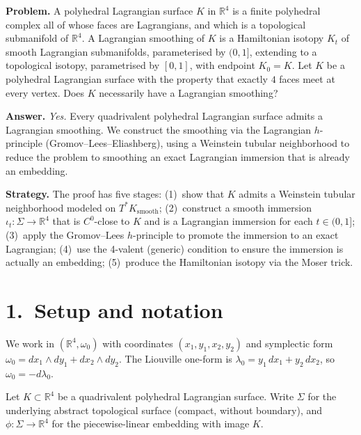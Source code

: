 

\noindent\textbf{Problem.}
A polyhedral Lagrangian surface $K$ in $\mathbb{R}^4$ is a finite polyhedral
complex all of whose faces are Lagrangians, and which is a topological
submanifold of $\mathbb{R}^4$. A Lagrangian smoothing of $K$ is a
Hamiltonian isotopy $K_t$ of smooth Lagrangian submanifolds, parameterised
by $(0,1]$, extending to a topological isotopy, parametrised by $[0,1]$,
with endpoint $K_0 = K$. Let $K$ be a polyhedral Lagrangian surface with
the property that exactly $4$ faces meet at every vertex. Does $K$
necessarily have a Lagrangian smoothing?


\bigskip
\noindent\textbf{Answer.} \textit{Yes.} Every quadrivalent polyhedral
Lagrangian surface admits a Lagrangian smoothing. We construct the smoothing
via the Lagrangian $h$-principle (Gromov--Lees--Eliashberg), using a Weinstein
tubular neighborhood to reduce the problem to smoothing an exact Lagrangian
immersion that is already an embedding.

\medskip
\noindent\textbf{Strategy.}
The proof has five stages:
(1)~show that $K$ admits a Weinstein tubular neighborhood modeled on
$T^*K_{\mathrm{smooth}}$;
(2)~construct a smooth immersion $\iota_t: \Sigma\to\mathbb{R}^4$ that is
$C^0$-close to $K$ and is a Lagrangian immersion for each $t\in(0,1]$;
(3)~apply the Gromov--Lees $h$-principle to promote the immersion to an
exact Lagrangian;
(4)~use the 4-valent (generic) condition to ensure the immersion is
actually an embedding;
(5)~produce the Hamiltonian isotopy via the Moser trick.

\section*{1.\ Setup and notation}
\label{sec:p8-setup}

We work in $(\mathbb{R}^4, \omega_0)$ with coordinates $(x_1,y_1,x_2,y_2)$
and symplectic form $\omega_0 = dx_1\wedge dy_1 + dx_2\wedge dy_2$. The
Liouville one-form is $\lambda_0 = y_1\,dx_1 + y_2\,dx_2$, so
$\omega_0 = -d\lambda_0$.

Let $K\subset\mathbb{R}^4$ be a quadrivalent polyhedral Lagrangian surface.
Write $\Sigma$ for the underlying abstract topological surface (compact,
without boundary), and $\phi: \Sigma\to\mathbb{R}^4$ for the piecewise-linear
embedding with image $K$.

